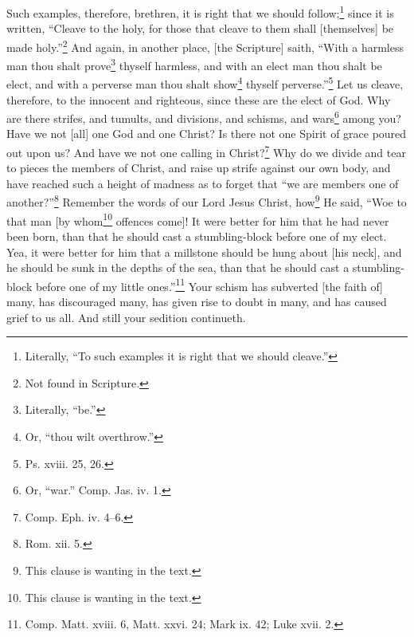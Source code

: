 Such examples, therefore, brethren, it is right that we should follow;\footnote{Literally, “To such examples it is right that we should cleave.”} since it is written, “Cleave to the holy, for those that cleave to them shall [themselves] be made holy.”\footnote{Not found in Scripture.} And again, in another place, [the Scripture] saith, “With a harmless man thou shalt prove\footnote{Literally, “be.”} thyself harmless, and with an elect man thou shalt be elect, and with a perverse man thou shalt show\footnote{Or, “thou wilt overthrow.”} thyself perverse.”\footnote{Ps. xviii. 25, 26.} Let us cleave, therefore, to the innocent and righteous, since these are the elect of God. Why are there strifes, and tumults, and divisions, and schisms, and wars\footnote{Or, “war.” Comp. Jas. iv. 1.} among you? Have we not [all] one God and one Christ? Is there not one Spirit of grace poured out upon us? And have we not one calling in Christ?\footnote{Comp. Eph. iv. 4–6.} Why do we divide and tear to pieces the members of Christ, and raise up strife against our own body, and have reached such a height of madness as to forget that “we are members one of another?”\footnote{Rom. xii. 5.} Remember the words of our Lord Jesus Christ, how\footnote{This clause is wanting in the text.} He said, “Woe to that man [by whom\footnote{This clause is wanting in the text.} offences come]! It were better for him that he had never been born, than that he should cast a stumbling-block before one of my elect. Yea, it were better for him that a millstone should be  hung about [his neck], and he should be sunk in the depths of the sea, than that he should cast a stumbling-block before one of my little ones.”\footnote{Comp. Matt. xviii. 6, Matt. xxvi. 24; Mark ix. 42; Luke xvii. 2.} Your schism has subverted [the faith of] many, has discouraged many, has given rise to doubt in many, and has caused grief to us all. And still your sedition continueth.



